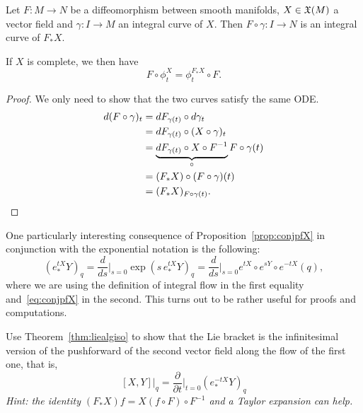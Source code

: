 \begin{proposition}\label{prop:conjpfX}
	Let $F: M \to N$ be a diffeomorphism between smooth manifolds, $X\in\mathfrak{X}(M)$ a vector field and $\gamma:I\to M$ an integral curve of $X$. Then $F\circ\gamma : I \to N$ is an integral curve of $F_* X$.

	If $X$ is complete, we then have
	\begin{equation}
		F\circ\phi_t^X = \phi_t^{F_* X}\circ F.
	\end{equation}
\end{proposition}
\begin{proof}
	We only need to show that the two curves satisfy the same ODE.
	\begin{align*}
		d(F\circ \gamma)_t
		 & = dF_{\gamma(t)} \circ d\gamma_t                                                \\
		 & = dF_{\gamma(t)} \circ (X \circ \gamma)_t                                       \\
		 & = \underbrace{dF_{\gamma(t)} \circ X \circ F^{-1}}_{\circ} F \circ \gamma(t) \\
		 & = (F_* X) \circ (F\circ \gamma)(t)                                              \\
		 & = (F_* X)_{F\circ\gamma(t)}.
	\end{align*}
\end{proof}

\begin{remark}
	One particularly interesting consequence of Proposition~\ref{prop:conjpfX} in conjunction with the exponential notation is the following:
	\begin{equation}\label{eq:expdiff}
		\left(e_*^{tX} Y\right)_q =
		\frac{d}{ds}\Big|_{s=0} \exp\left(s\, e_*^{tX} Y\right)_q =
		\frac{d}{ds}\Big|_{s=0} e^{tX}\circ e^{sY}\circ e^{-t X}(q),
	\end{equation}
	where we are using the definition of integral flow in the first equality and~\eqref{eq:conjpfX} in the second.
	This turns out to be rather useful for proofs and computations.
\end{remark}

\begin{exercise}
	Use Theorem~\ref{thm:liealgiso} to show that the Lie bracket is the infinitesimal version of the pushforward of the second vector field along the flow of the first one, that is,
	\begin{equation}\label{def:liebracketsecondversion}
		[X,Y]\big|_q = \frac{\partial}{\partial t}\Big|_{t=0} (e_*^{-t X} Y)_q
	\end{equation}
	\textit{\small Hint: the identity $(F_* X)f = X(f\circ F)\circ F^{-1}$ and a Taylor expansion can help.}
\end{exercise}

